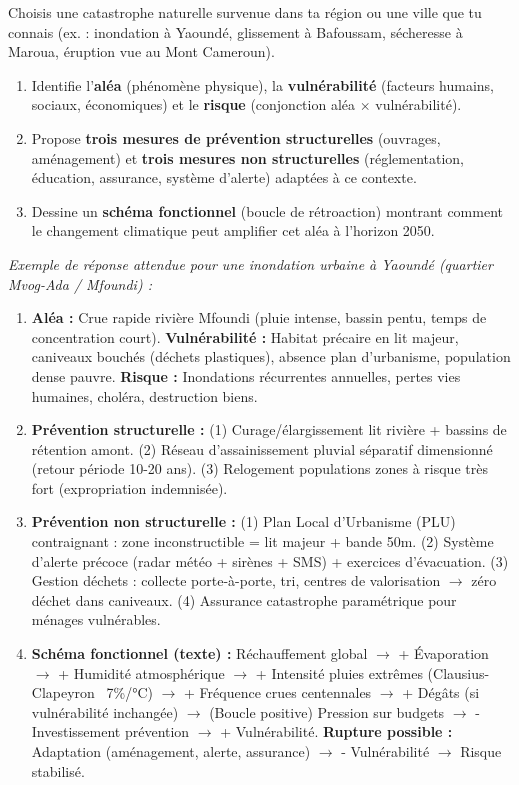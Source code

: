 \documentclass[11pt]{article}
\begin{document}
\begin{exercice}
Choisis une catastrophe naturelle survenue dans ta région ou une ville que tu connais (ex. : inondation à Yaoundé, glissement à Bafoussam, sécheresse à Maroua, éruption vue au Mont Cameroun).
\begin{enumerate}
    \item Identifie l'\textbf{aléa} (phénomène physique), la \textbf{vulnérabilité} (facteurs humains, sociaux, économiques) et le \textbf{risque} (conjonction aléa $\times$ vulnérabilité).
    \item Propose \textbf{trois mesures de prévention structurelles} (ouvrages, aménagement) et \textbf{trois mesures non structurelles} (réglementation, éducation, assurance, système d'alerte) adaptées à ce contexte.
    \item Dessine un \textbf{schéma fonctionnel} (boucle de rétroaction) montrant comment le changement climatique peut amplifier cet aléa à l'horizon 2050.
\end{enumerate}
\end{exercice}

\begin{corrige}
\textit{Exemple de réponse attendue pour une inondation urbaine à Yaoundé (quartier Mvog-Ada / Mfoundi) :}
\begin{enumerate}
    \item \textbf{Aléa :} Crue rapide rivière Mfoundi (pluie intense, bassin pentu, temps de concentration court). \textbf{Vulnérabilité :} Habitat précaire en lit majeur, caniveaux bouchés (déchets plastiques), absence plan d'urbanisme, population dense pauvre. \textbf{Risque :} Inondations récurrentes annuelles, pertes vies humaines, choléra, destruction biens.
    \item \textbf{Prévention structurelle :} (1) Curage/élargissement lit rivière + bassins de rétention amont. (2) Réseau d'assainissement pluvial séparatif dimensionné (retour période 10-20 ans). (3) Relogement populations zones à risque très fort (expropriation indemnisée).
    \item \textbf{Prévention non structurelle :} (1) Plan Local d'Urbanisme (PLU) contraignant : zone inconstructible = lit majeur + bande 50m. (2) Système d'alerte précoce (radar météo + sirènes + SMS) + exercices d'évacuation. (3) Gestion déchets : collecte porte-à-porte, tri, centres de valorisation $\rightarrow$ zéro déchet dans caniveaux. (4) Assurance catastrophe paramétrique pour ménages vulnérables.
    \item \textbf{Schéma fonctionnel (texte) :} Réchauffement global $\rightarrow$ + Évaporation $\rightarrow$ + Humidité atmosphérique $\rightarrow$ + Intensité pluies extrêmes (Clausius-Clapeyron ~7\%/°C) $\rightarrow$ + Fréquence crues centennales $\rightarrow$ + Dégâts (si vulnérabilité inchangée) $\rightarrow$ (Boucle positive) Pression sur budgets $\rightarrow$ - Investissement prévention $\rightarrow$ + Vulnérabilité. \textbf{Rupture possible :} Adaptation (aménagement, alerte, assurance) $\rightarrow$ - Vulnérabilité $\rightarrow$ Risque stabilisé.
\end{enumerate}
\end{corrige}
\end{document}
